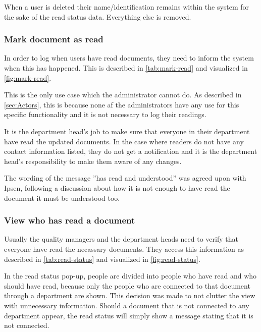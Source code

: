 When a user is deleted their name/identification remains within the system for the sake of the read status data.
Everything else is removed.

\subsubsection{Mark document as read}
In order to log when users have read documents, they need to inform the system when this has happened.
This is described in \cref{tab:mark-read} and visualized in \cref{fig:mark-read}.




This is the only use case which the administrator cannot do.
As described in \cref{sec:Actors}, this is because none af the administrators have any use for this specific functionality and it is not necessary to log their readings.

It is the department head's job to make sure that everyone in their department have read the updated documents.
In the case where readers do not have any contact information listed, they do not get a notification and it is the department head's responsibility to make them aware of any changes.

The wording of the message ''has read and understood'' was agreed upon with Ipsen, following a discussion about how it is not enough to have read the document it must be understood too.

\subsubsection{View who has read a document}
Usually the quality managers and the department heads need to verify that everyone have read the necassary documents.
They access this information as described in \cref{tab:read-status} and visualized in \cref{fig:read-status}.




In the read status pop-up, people are divided into people who have read and who should have read, because only the people who are connected to that document through a department are shown.
This decision was made to not clutter the view with unnecessary information.
Should a document that is not connected to any department appear, the read status will simply show a message stating that it is not connected.

